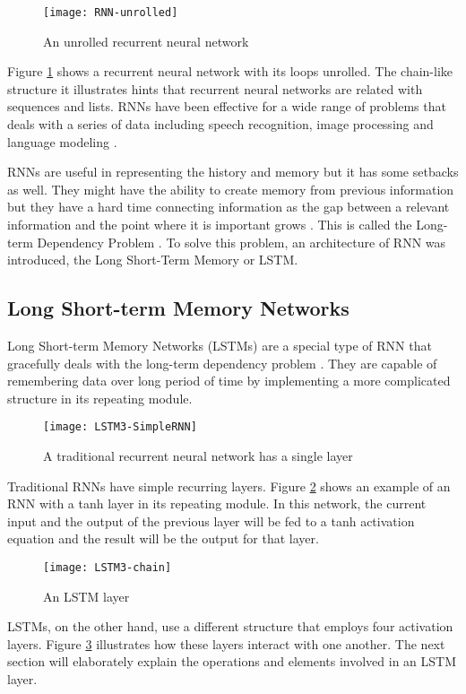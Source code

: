     \begin{figure}[H]
    \centering
    \texttt{[image: RNN-unrolled]}
    \caption{An unrolled recurrent neural network \cite{olah2015understanding}}
    \label{fig:rnn-unrolled}
    \end{figure}
    Figure \ref{fig:rnn-unrolled} shows a recurrent neural network with its loops unrolled. The chain-like structure it illustrates hints that recurrent neural networks are related with sequences and lists. RNNs have been effective for a wide range of problems that deals with a series of data including speech recognition, image processing and language modeling \cite{olah2015understanding}.

    RNNs are useful in representing the history and memory but it has some setbacks as well. They might have the ability to create memory from previous information but they have a hard time connecting information as the gap between a relevant information and the point where it is important grows \cite{graves2012supervised}. This is called the Long-term Dependency Problem \cite{bengio1994learning}. To solve this problem, an architecture of RNN was introduced, the Long Short-Term Memory or LSTM.

\subsection{Long Short-term Memory Networks}
    Long Short-term Memory Networks (LSTMs) are a special type of RNN that gracefully deals with the long-term dependency problem \cite{hochreiter1997long}. They are capable of remembering data over long period of time by implementing a more complicated structure in its repeating module.

    \begin{figure}[H]
    \centering
    \texttt{[image: LSTM3-SimpleRNN]}
    \caption{A traditional recurrent neural network has a single layer \cite{olah2015understanding}}
    \label{fig:rnn}
    \end{figure}
    Traditional RNNs have simple recurring layers. Figure \ref{fig:rnn} shows an example of an RNN with a tanh layer in its repeating module. In this network, the current input and the output of the previous layer will be fed to a tanh activation equation and the result will be the output for that layer.
    
    \begin{figure}[H]
    \centering
    \texttt{[image: LSTM3-chain]}
    \caption{An LSTM layer \cite{olah2015understanding}}
    \label{fig:chain}
    \end{figure}
    LSTMs, on the other hand, use a different structure that employs four activation layers. Figure \ref{fig:chain} illustrates how these layers interact with one another. The next section will elaborately explain the operations and elements involved in an LSTM layer.

